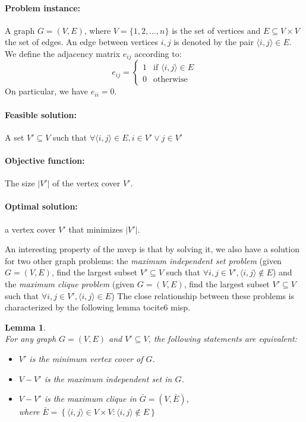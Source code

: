 \documentclass[12pt]{article}
\newtheorem{lemma}{Lemma}
\begin{document}
{
\setlength{\parskip}{0em}
\paragraph{Problem instance:}
A graph $G = (V, E)$, where $V = \{1, 2, \dots, n\}$
is the set of vertices and $E \subseteq V \times V$ the
set of edges.
An edge between vertices $i, j$ is denoted
by the pair $\langle i, j \rangle \in E$.
We define the adjacency matrix $e_{ij}$ according to:
\[
e_{ij} =
\begin{cases}
1 & \text{if } \langle i, j \rangle \in E \\
0 & \text{otherwise}
\end{cases}
\]
On particular, we have $e_{ii} = 0$.

\paragraph{Feasible solution:} A set $V' \subseteq V$ such that
$\forall \langle i, j \rangle \in E, i \in V' \vee j \in V'$
\paragraph{Objective function:} The size $|V'|$ of the vertex cover $V'$.
\paragraph{Optimal solution:} a vertex cover $V'$ that minimizes $|V'|$.
}

An interesting property of the mvcp is that by
solving it, we also have a solution for two other
graph problems: the \textit{maximum independent set problem}
(given $G = (V, E)$, find the largest subset $V' \subseteq V$
such that $\forall i, j \in V', \langle i, j \rangle \notin E$)
and the \textit{maximum clique problem}
(given $G = (V, E)$, find the largest subset $V' \subseteq V$
such that $\forall i, j \in V', \langle i, j \rangle \in E$)
The close relationship between these problems is characterized
by the following lemma tocite{6 misp}.
\begin{lemma}
\ \\[3mm]
For any graph $G = (V, E)$ and $V' \subseteq V$, the following
statements are equivalent:
\begin{itemize}
\vspace{-3mm}
\setlength{\parskip}{0.5em}
\item $V'$ is the minimum vertex cover of $G$.
\item $V - V'$ is the maximum independent set in $G$.
\item $V - V'$ is the maximum clique in $\bar{G} = (V, \bar{E})$,\\[1mm]
where
$\bar{E}=\left\{ \langle i, j \rangle\in V \times V :
\langle i, j \rangle \notin E \right\}$
\end{itemize}
\end{lemma}
\end{document}
